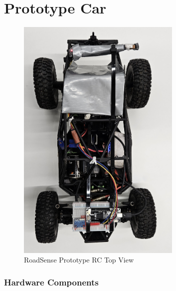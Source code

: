 \section{Prototype Car}

\begin{figure}[ht!]
    \centering
    \includegraphics[angle=90,width=0.7\textwidth]{../../assets/images/roadsense_rc_top.jpg}
    \caption{RoadSense Prototype RC Top View}
\end{figure}

\subsubsection{Hardware Components}

